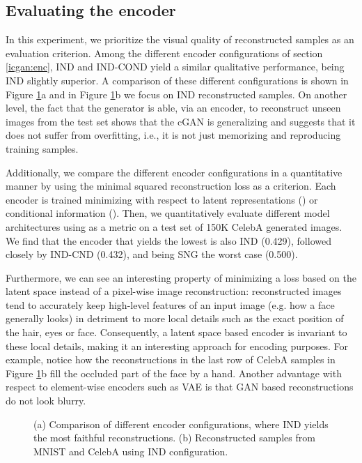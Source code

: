 \documentclass{article}
\begin{document}
\subsection{Evaluating the encoder} \label{exp:enc_eval}
In this experiment, we prioritize the visual quality of reconstructed samples as an evaluation criterion. Among the different encoder configurations of section \ref{icgan:enc}, IND and IND-COND yield a similar qualitative performance, being IND slightly superior. A comparison of these different configurations is shown in Figure \ref{fig:encoder_samples}a and in Figure \ref{fig:encoder_samples}b we focus on IND reconstructed samples. 
On another level, the fact that the generator is able, via an encoder, to reconstruct unseen images from the test set shows that the cGAN is generalizing and suggests that it does not suffer from overfitting, i.e., it is not just memorizing and reproducing training samples. 

Additionally, we compare the different encoder configurations in a quantitative manner by using the minimal squared reconstruction loss  as a criterion. Each encoder is trained minimizing  with respect to latent representations  () or conditional information  (). Then, we quantitatively evaluate different model architectures using  as a metric on a test set of 150K CelebA generated images. We find that the encoder that yields the lowest  is also IND (0.429), followed closely by IND-CND (0.432), and being SNG the worst case (0.500). 

Furthermore, we can see an interesting property of minimizing a loss based on the latent space instead of a pixel-wise image reconstruction: reconstructed images tend to accurately keep high-level features of an input image (e.g. how a face generally looks) in detriment to more local details such as the exact position of the hair, eyes or face. Consequently, a latent space based encoder is invariant to these local details, making it an interesting approach for encoding purposes. For example, notice how the reconstructions in the last row of CelebA samples in Figure \ref{fig:encoder_samples}b fill the occluded part of the face by a hand. Another advantage with respect to element-wise encoders such as VAE is that GAN based reconstructions do not look blurry.


\begin{figure}[t]
        \centering
        \qquad
        \caption{(a) Comparison of different encoder configurations, where IND yields the most faithful reconstructions. (b) Reconstructed samples from MNIST and CelebA using IND configuration.}
        \label{fig:encoder_samples}
\end{figure}
\end{document}
